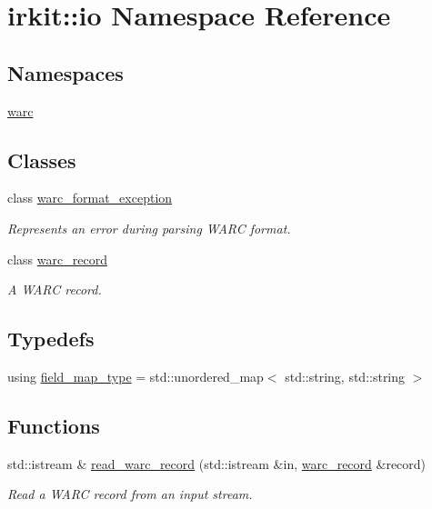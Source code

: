 \hypertarget{namespaceirkit_1_1io}{}\section{irkit\+:\+:io Namespace Reference}
\label{namespaceirkit_1_1io}
\subsection*{Namespaces}
\begin{DoxyCompactItemize}
\item 
 \mbox{\hyperlink{namespaceirkit_1_1io_1_1warc}{warc}}
\end{DoxyCompactItemize}
\subsection*{Classes}
\begin{DoxyCompactItemize}
\item 
class \mbox{\hyperlink{classirkit_1_1io_1_1warc__format__exception}{warc\+\_\+format\+\_\+exception}}
\begin{DoxyCompactList}\small\item\em Represents an error during parsing W\+A\+RC format. \end{DoxyCompactList}\item 
class \mbox{\hyperlink{classirkit_1_1io_1_1warc__record}{warc\+\_\+record}}
\begin{DoxyCompactList}\small\item\em A W\+A\+RC record. \end{DoxyCompactList}\end{DoxyCompactItemize}
\subsection*{Typedefs}
\begin{DoxyCompactItemize}
\item 
using \mbox{\hyperlink{namespaceirkit_1_1io_a3293145f3599deb5abb1ec2ed6d2c2ae}{field\+\_\+map\+\_\+type}} = std\+::unordered\+\_\+map$<$ std\+::string, std\+::string $>$
\end{DoxyCompactItemize}
\subsection*{Functions}
\begin{DoxyCompactItemize}
\item 
std\+::istream \& \mbox{\hyperlink{namespaceirkit_1_1io_a161dcbb8924839e4923f2df26ebe5ea9}{read\+\_\+warc\+\_\+record}} (std\+::istream \&in, \mbox{\hyperlink{classirkit_1_1io_1_1warc__record}{warc\+\_\+record}} \&record)
\begin{DoxyCompactList}\small\item\em Read a W\+A\+RC record from an input stream. \end{DoxyCompactList}\end{DoxyCompactItemize}


